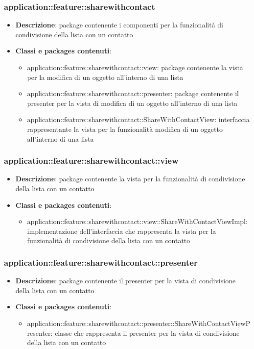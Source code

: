 \subsubsection{application::feature::sharewithcontact}
\begin{itemize}
	\item \textbf{Descrizione}: package contenente i componenti per la funzionalità di condivisione della lista con un contatto
	\item \textbf{Classi e packages contenuti}:
	\begin{itemize}
	\item application::feature::sharewithcontact::view: package contenente la vista per la modifica di un oggetto all'interno di una lista
	\item application::feature::sharewithcontact::presenter: package contenente il presenter per la vista di modifica di un oggetto all'interno di una lista
	\item application::feature::sharewithcontact::ShareWithContactView: interfaccia rappresentante la vista per la funzionalità modifica di un oggetto all'interno di una lista
	\end{itemize}
\end{itemize}

\subsubsection{application::feature::sharewithcontact::view}
\begin{itemize}
	\item \textbf{Descrizione}: package contenente la vista per la funzionalità di condivisione della lista con un contatto
	\item \textbf{Classi e packages contenuti}:
	\begin{itemize}
	\item application::feature::sharewithcontact::view::ShareWithContactViewImpl: implementazione dell'interfaccia che rappresenta la vista per la funzionalità di condivisione della lista con un contatto
	\end{itemize}
\end{itemize}

\subsubsection{application::feature::sharewithcontact::presenter}
\begin{itemize}
	\item \textbf{Descrizione}: package contenente il presenter per la vista di condivisione della lista con un contatto
	\item \textbf{Classi e packages contenuti}:
	\begin{itemize}
	\item application::feature::sharewithcontact::presenter::ShareWithContactViewPresenter: classe che rappresenta il presenter per la vista di condivisione della lista con un contatto
	\end{itemize}
\end{itemize}


